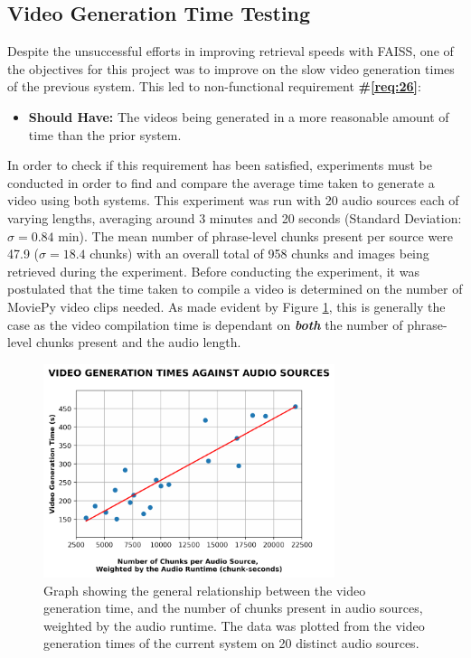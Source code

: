 \documentclass{l4proj}
\begin{document}
\subsection{Video Generation Time Testing}
\label{sec:video_generation_time}
Despite the unsuccessful efforts in improving retrieval speeds with FAISS, one of the objectives for this project was to improve on the slow video generation times of the previous system. This led to non-functional requirement \textbf{\#\ref{req:26}}:

\begin{itemize}
    \item \textbf{Should Have:} The videos being generated in a more reasonable amount of time than the prior system.
\end{itemize}

In order to check if this requirement has been satisfied, experiments must be conducted in order to find and compare the average time taken to generate a video using both systems. This experiment was run with 20 audio sources each of varying lengths, averaging around 3 minutes and 20 seconds (Standard Deviation: $\sigma = 0.84$ min). The mean number of phrase-level chunks present per source were 47.9 ($\sigma = 18.4$ chunks) with an overall total of 958 chunks and images being retrieved during the experiment. Before conducting the experiment, it was postulated that the time taken to compile a video is determined on the number of MoviePy video clips needed. As made evident by Figure \ref{fig:videography_against_wchunks}, this is generally the case as the video compilation time is dependant on \textbf{\emph{both}} the number of phrase-level chunks present and the audio length.

\begin{figure}[H]
    \centering
    \includegraphics[width=0.76\textwidth]{figures/video_generation_against_wchunks.pdf}
    \caption{Graph showing the general relationship between the video generation time, and the number of chunks present in audio sources, weighted by the audio runtime. The data was plotted from the video generation times of the current system on 20 distinct audio sources.}
    \label{fig:videography_against_wchunks}
\end{figure}
\end{document}

